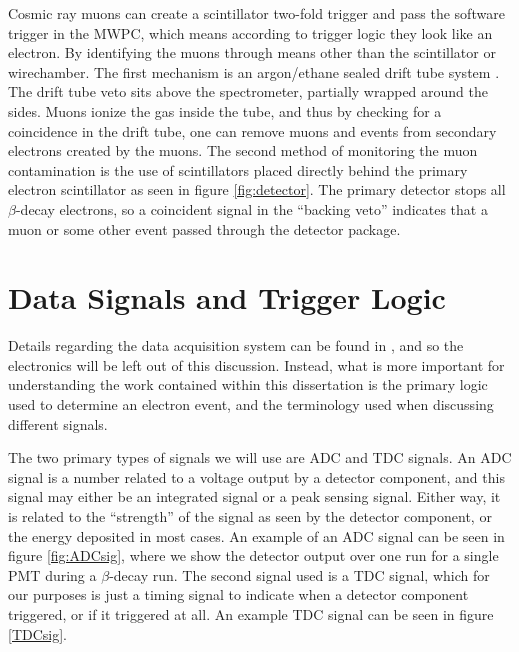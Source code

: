 Cosmic ray muons can create a scintillator two-fold trigger and pass the software trigger in
the MWPC, which means according to trigger logic they look like an electron. By identifying
the muons through means other than the scintillator or wirechamber. The first mechanism
is an argon/ethane sealed drift tube system \cite{rios2011sealed}. The drift tube veto sits
above the spectrometer, partially wrapped around the sides. Muons ionize the gas inside the
tube, and thus by checking for a coincidence in the drift tube, one can remove muons
and events from secondary electrons created by the muons. The second method of monitoring
the muon contamination is the use of scintillators placed directly behind the primary
electron scintillator as seen in figure \ref{fig:detector}. The primary detector
stops all $\beta$-decay electrons, so a coincident signal in the ``backing veto''
indicates that a muon or some other event passed through the detector package.

\section{Data Signals and Trigger Logic}

Details regarding the data acquisition system can be found in \cite{plaster2012,mpmThesis}, and
so the electronics will be left out of this discussion. Instead, what is more important for
understanding the work contained within this dissertation is the primary logic used to
determine an electron event, and the terminology used when discussing different signals.

The two primary types of signals we will use are ADC and TDC signals.
An ADC signal is a number related to a voltage output by a detector component, and this
signal may either be an integrated signal or a peak sensing signal. Either way, it is related
to the ``strength'' of the signal as seen by the detector component, or the energy deposited
in most cases. An example of an ADC signal can be seen in figure \ref{fig:ADCsig}, where we show the
detector output over one run for a single PMT during a $\beta$-decay run.
The second signal used is a TDC signal, which for our purposes is
just a timing signal to indicate when a detector component triggered, or if it triggered at all.
An example TDC signal can be
seen in figure \ref{TDCsig}.

